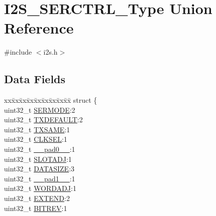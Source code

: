 \hypertarget{union_i2_s___s_e_r_c_t_r_l___type}{}\section{I2\+S\+\_\+\+S\+E\+R\+C\+T\+R\+L\+\_\+\+Type Union Reference}
\label{union_i2_s___s_e_r_c_t_r_l___type}


{\ttfamily \#include $<$i2s.\+h$>$}

\subsection*{Data Fields}
\begin{DoxyCompactItemize}
\item 
\begin{tabbing}
xx\=xx\=xx\=xx\=xx\=xx\=xx\=xx\=xx\=\kill
struct \{\\
\>uint32\_t \mbox{\hyperlink{union_i2_s___s_e_r_c_t_r_l___type_ab142359e2ef81bd5b02486994aab408e}{SERMODE}}:2\\
\>uint32\_t \mbox{\hyperlink{union_i2_s___s_e_r_c_t_r_l___type_a05eb9e208cf0b81d2b5a5a7e9014a561}{TXDEFAULT}}:2\\
\>uint32\_t \mbox{\hyperlink{union_i2_s___s_e_r_c_t_r_l___type_a909b17ca68c3031a0c163e02c38660c5}{TXSAME}}:1\\
\>uint32\_t \mbox{\hyperlink{union_i2_s___s_e_r_c_t_r_l___type_a2d60506d51b3a56165ab36addfb99346}{CLKSEL}}:1\\
\>uint32\_t \mbox{\hyperlink{union_i2_s___s_e_r_c_t_r_l___type_a3e57c2ef1c3ffb36722f000cc1156824}{\_\_pad0\_\_}}:1\\
\>uint32\_t \mbox{\hyperlink{union_i2_s___s_e_r_c_t_r_l___type_aea31b752b0590a42f82ab8add68813b8}{SLOTADJ}}:1\\
\>uint32\_t \mbox{\hyperlink{union_i2_s___s_e_r_c_t_r_l___type_a507228ba18f925692f14f905628abd7f}{DATASIZE}}:3\\
\>uint32\_t \mbox{\hyperlink{union_i2_s___s_e_r_c_t_r_l___type_a6712ba6dd1d5b43d2d56ff8ac4e275a7}{\_\_pad1\_\_}}:1\\
\>uint32\_t \mbox{\hyperlink{union_i2_s___s_e_r_c_t_r_l___type_a95a99b6b64454354d7e33c0f2033ec1d}{WORDADJ}}:1\\
\>uint32\_t \mbox{\hyperlink{union_i2_s___s_e_r_c_t_r_l___type_a7611334e511aae0f1d0791db6f5afbe4}{EXTEND}}:2\\
\>uint32\_t \mbox{\hyperlink{union_i2_s___s_e_r_c_t_r_l___type_ae445e5caf17a15e3a78d0e0c72f9b73b}{BITREV}}:1\\

\end{tabbing}
\end{DoxyCompactItemize}
